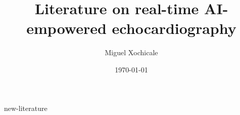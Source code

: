 \documentclass[12pt]{article}
\title{Literature on real-time AI-empowered echocardiography}
\author{
Miguel Xochicale
}
\date{
\today
}
\begin{document}
\maketitle
\thispagestyle{empty} %

\tableofcontents
{new-literature}

%


\end{document}
